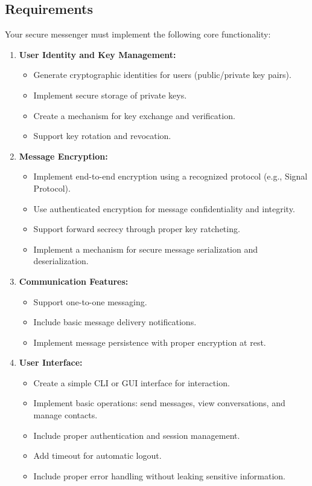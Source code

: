 \documentclass[10pt,a4paper,american]{article}
\begin{document}
\subsection*{Requirements}
Your secure messenger must implement the following core functionality:

\begin{enumerate}
	\item \textbf{User Identity and Key Management:}
	      \begin{itemize}
		      \item Generate cryptographic identities for users (public/private key pairs).
		      \item Implement secure storage of private keys.
		      \item Create a mechanism for key exchange and verification.
		      \item Support key rotation and revocation.
	      \end{itemize}

	\item \textbf{Message Encryption:}
	      \begin{itemize}
		      \item Implement end-to-end encryption using a recognized protocol (e.g., Signal Protocol).
		      \item Use authenticated encryption for message confidentiality and integrity.
		      \item Support forward secrecy through proper key ratcheting.
		      \item Implement a mechanism for secure message serialization and deserialization.
	      \end{itemize}

	\item \textbf{Communication Features:}
	      \begin{itemize}
		      \item Support one-to-one messaging.
		      \item Include basic message delivery notifications.
		      \item Implement message persistence with proper encryption at rest.
	      \end{itemize}

	\item \textbf{User Interface:}
	      \begin{itemize}
		      \item Create a simple CLI or GUI interface for interaction.
		      \item Implement basic operations: send messages, view conversations, and manage contacts.
		      \item Include proper authentication and session management.
		      \item Add timeout for automatic logout.
		      \item Include proper error handling without leaking sensitive information.
	      \end{itemize}
\end{enumerate}
\end{document}
